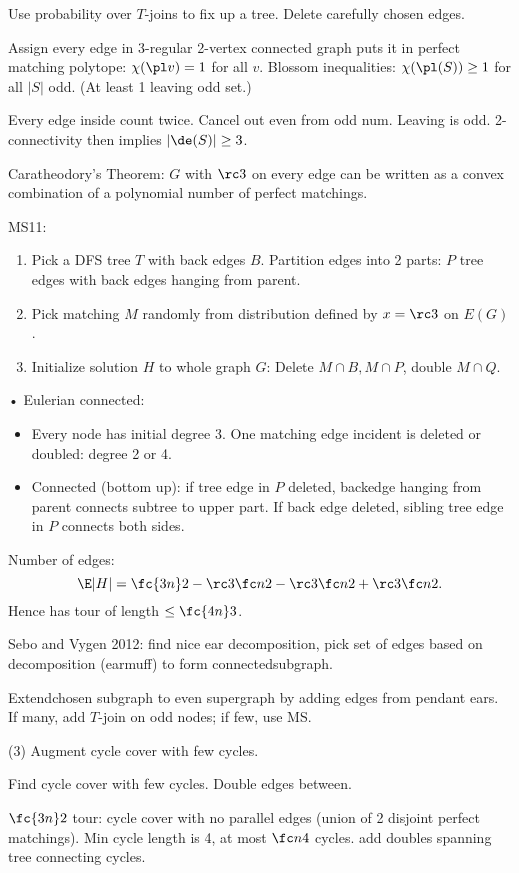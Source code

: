 Use probability over $T$-joins to fix up a tree. Delete carefully chosen edges.

Assign every edge in 3-regular 2-vertex connected graph puts it in perfect matching polytope: $\chi(\pl v)=1$ for all $v$. Blossom inequalities: $\chi(\pl(S))\ge 1$ for all $|S|$ odd. (At least 1 leaving odd set.)

Every edge inside count twice. Cancel out even from odd num. Leaving is odd. 2-connectivity then implies $|\de(S)|\ge 3$.

Caratheodory's Theorem: $G$ with $\rc3$ on every edge can be written as a convex combination of a polynomial number of perfect matchings.

MS11: 
\begin{enumerate}
\item
Pick a DFS tree $T$ with back edges $B$. Partition edges into 2 parts: $P$ tree edges with back edges hanging from parent.
\item
Pick matching $M$ randomly from distribution defined by $x=\rc3$ on $E(G)$.
\item
Initialize solution $H$ to whole graph $G$: Delete $M\cap B, M\cap P$, double $M\cap Q$.
\end{enumerate}•
Eulerian connected:
\begin{itemize}
\item
Every node has initial degree 3. One matching edge incident is deleted or doubled: degree 2 or 4.
\item
Connected (bottom up): if tree edge in $P$ deleted, backedge hanging from parent connects subtree to upper part.
If back edge deleted, sibling tree edge in $P$ connects both sides.
\end{itemize}
Number of edges:
\[
\E|H| = \fc{3n}2-\rc3\fc n2 - \rc3\fc n2 + \rc3 \fc n2.
\]
Hence has tour of length $\le \fc{4n}3$.

Sebo and Vygen 2012: find nice ear decomposition, pick set of edges based on decomposition (earmuff) to form connectedsubgraph. 

Extendchosen subgraph to even supergraph by adding edges from pendant ears. If many, add $T$-join on odd nodes; if few, use MS.

(3) Augment cycle cover with few cycles. 

Find cycle cover with few cycles. Double edges between.

$\fc{3n}2$ tour: cycle cover with no parallel edges (union of 2 disjoint perfect matchings). Min cycle length is 4, at most $\fc n4$ cycles. add doubles spanning tree connecting cycles.

